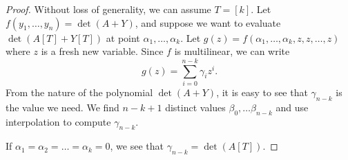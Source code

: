 \documentclass[11pt,letterpaper]{article}
\DeclareMathOperator*{\diag}{diag}
\newcommand{\PME}{\stackrel{\mathclap{\scalebox{.4}{\mbox{PME}}}}{=}}
\begin{document}
{{{\begin{proof}
    Without loss of generality, we can assume $T = [k]$. Let $f(y_1,\dots,y_n) = \det(A+Y)$, and suppose we want to evaluate $\det(A[T] + Y[T])$ at point $\alpha_1,\dots,\alpha_k$. Let $g(z) = f(\alpha_1,\dots,\alpha_k,z,z,\dots,z)$ where $z$ is a fresh new variable. Since $f$ is multilinear, we can write $$g(z) = \sum_{i=0}^{n-k} \gamma_i z^i\text{.}$$ From the nature of the polynomial $\det(A+Y)$, it is easy to see that $\gamma_{n-k}$ is the value we need. We find $n-k+1$ distinct values $\beta_0,\dots \beta_{n-k}$ and use interpolation to compute $\gamma_{n-k}$.

    If $\alpha_1=\alpha_2=\dots=\alpha_k=0$, we see that $\gamma_{n-k} = \det(A[T])$.
\end{proof}


}}}
\end{document}
